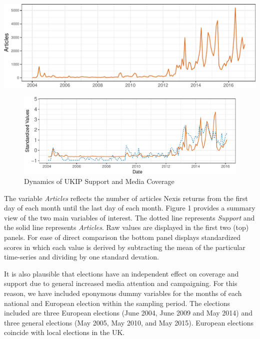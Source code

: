 \documentclass[12pt,]{article}
\makeatletter
\def\maxwidth{\ifdim\Gin@nat@width>\linewidth\linewidth
\else\Gin@nat@width\fi}
\let\Oldincludegraphics\includegraphics
\renewcommand{\includegraphics}[1]{\Oldincludegraphics[width=\maxwidth]{#1}}
\makeatother
\begin{document}
\includegraphics{ukip_media_files/figure-latex/unnamed-chunk-2-1.pdf}

\begin{figure}[htbp]
\centering
\includegraphics{ukip_media_files/figure-latex/unnamed-chunk-3-1.pdf}
\caption{Dynamics of UKIP Support and Media Coverage}
\end{figure}

\setlength\parindent{24pt}

The variable \emph{Articles} reflects the number of articles Nexis
returns from the first day of each month until the last day of each
month. Figure 1 provides a summary view of the two main variables of
interest. The dotted line represents \emph{Support} and the solid line
represents \emph{Articles}. Raw values are displayed in the first two
(top) panels. For ease of direct comparison the bottom panel displays
standardized scores in which each value is derived by subtracting the
mean of the particular time-series and dividing by one standard
devation.

It is also plausible that elections have an independent effect on
coverage and support due to general increased media attention and
campaigning. For this reason, we have included eponymous dummy variables
for the months of each national and European election within the
sampling period. The elections included are three European elections
(June 2004, June 2009 and May 2014) and three general elections (May
2005, May 2010, and May 2015). European elections coincide with local
elections in the UK.
\end{document}
